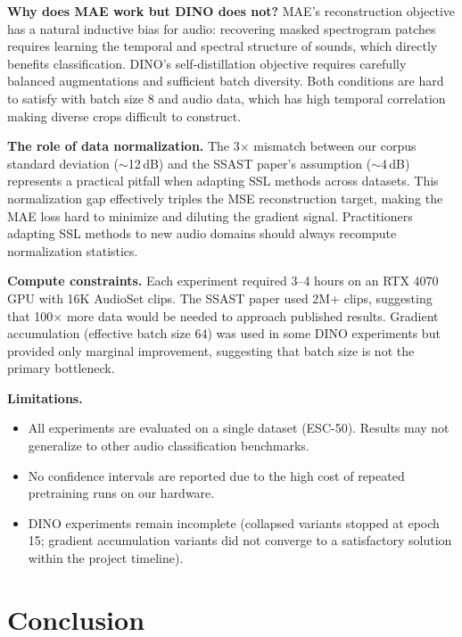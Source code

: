\documentclass{article}
\begin{document}
\noindent\textbf{Why does MAE work but DINO does not?}
MAE's reconstruction objective has a natural inductive bias for audio: recovering masked spectrogram patches requires learning the temporal and spectral structure of sounds, which directly benefits classification. DINO's self-distillation objective requires carefully balanced augmentations and sufficient batch diversity. Both conditions are hard to satisfy with batch size 8 and audio data, which has high temporal correlation making diverse crops difficult to construct.

\noindent\textbf{The role of data normalization.}
The 3$\times$ mismatch between our corpus standard deviation ($\sim$12\,dB) and the SSAST paper's assumption ($\sim$4\,dB) represents a practical pitfall when adapting SSL methods across datasets. This normalization gap effectively triples the MSE reconstruction target, making the MAE loss hard to minimize and diluting the gradient signal. Practitioners adapting SSL methods to new audio domains should always recompute normalization statistics.

\noindent\textbf{Compute constraints.}
Each experiment required 3--4 hours on an RTX 4070 GPU with 16K AudioSet clips. The SSAST paper used 2M+ clips, suggesting that 100$\times$ more data would be needed to approach published results. Gradient accumulation (effective batch size 64) was used in some DINO experiments but provided only marginal improvement, suggesting that batch size is not the primary bottleneck.

\noindent\textbf{Limitations.}
\begin{itemize}
    \item All experiments are evaluated on a single dataset (ESC-50). Results may not generalize to other audio classification benchmarks.
    \item No confidence intervals are reported due to the high cost of repeated pretraining runs on our hardware.
    \item DINO experiments remain incomplete (collapsed variants stopped at epoch 15; gradient accumulation variants did not converge to a satisfactory solution within the project timeline).
\end{itemize}

\section{Conclusion}
\label{sec:conclusion}
\end{document}
